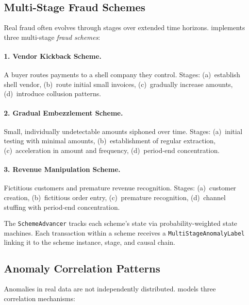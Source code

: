 \subsection{Multi-Stage Fraud Schemes}
\label{sec:anom_schemes}

Real fraud often evolves through stages over extended time horizons.
\system{} implements three multi-stage \emph{fraud schemes}:

\paragraph{1. Vendor Kickback Scheme.}
A buyer routes payments to a shell company they control.  Stages:
(a)~establish shell vendor, (b)~route initial small invoices,
(c)~gradually increase amounts, (d)~introduce collusion patterns.

\paragraph{2. Gradual Embezzlement Scheme.}
Small, individually undetectable amounts siphoned over time.  Stages:
(a)~initial testing with minimal amounts, (b)~establishment of regular
extraction, (c)~acceleration in amount and frequency, (d)~period-end
concentration.

\paragraph{3. Revenue Manipulation Scheme.}
Fictitious customers and premature revenue recognition.  Stages:
(a)~customer creation, (b)~fictitious order entry, (c)~premature
recognition, (d)~channel stuffing with period-end concentration.

The \texttt{SchemeAdvancer} tracks each scheme's state via
probability-weighted state machines.  Each transaction within a scheme
receives a \texttt{MultiStageAnomalyLabel} linking it to the scheme
instance, stage, and causal chain.

\subsection{Anomaly Correlation Patterns}
\label{sec:anom_correlation}

Anomalies in real data are not independently distributed.  \system{}
models three correlation mechanisms:

